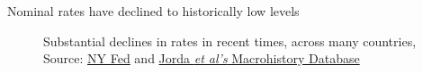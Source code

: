 \begin{frame}{Nominal rates have declined to historically low levels}

\begin{figure}
\begin{center}


\end{center}
\caption{Substantial declines in rates in recent times, across many countries, Source: \href{https://voxeu.org/article/global-trends-interest-rates}{NY Fed} and \href{http://www.macrohistory.net/data}{Jorda \textit{et al's} Macrohistory Database}}
\end{figure}

\end{frame}


	
